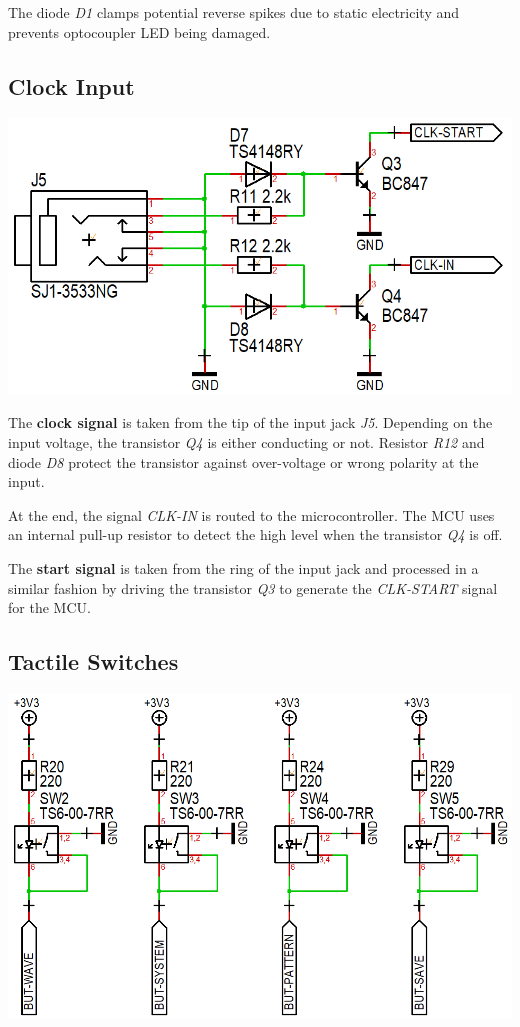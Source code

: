\documentclass{scrartcl}
\begin{document}
The diode \emph{D1} clamps potential reverse spikes due to static electricity and prevents optocoupler LED being damaged.

\pagebreak
\subsection{Clock Input}

\begin{center}
    \includegraphics[scale=0.40]{assets/schema-clocks.png}
\end{center}

The \textbf{clock signal} is taken from the tip of the input jack \emph{J5}. Depending on the input voltage, the transistor \emph{Q4} is either conducting or not. Resistor \emph{R12} and diode \emph{D8} protect the transistor against over-voltage or wrong polarity at the input.

At the end, the signal \emph{CLK-IN} is routed to the microcontroller. The MCU uses an internal pull-up resistor to detect the high level when the transistor \emph{Q4} is off.

The \textbf{start signal} is taken from the ring of the input jack and processed in a similar fashion by driving the transistor \emph{Q3} to generate the \emph{CLK-START} signal for the MCU.

\subsection{Tactile Switches}

\vspace{0.50cm}
\begin{center}
    \includegraphics[scale=0.35]{assets/schema-switch.png}
\end{center}
\end{document}
